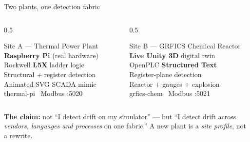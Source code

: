 \documentclass[aspectratio=169,11pt]{beamer}
\newcommand{\hl}[1]{{\color{accent}\textbf{#1}}}
\newcommand{\code}[1]{{\ttfamily\small #1}}
\begin{document}
\begin{frame}{Two plants, one detection fabric}
\begin{columns}[T]
\begin{column}{0.5\textwidth}
\begin{block}{Site A --- Thermal Power Plant}
\small
\textbf{Raspberry Pi} (real hardware)\\
Rockwell \textbf{L5X} ladder logic\\
Structural \emph{+} register detection\\
Animated SVG SCADA mimic\\
\code{thermal-pi} \textbullet\ Modbus :5020
\end{block}
\end{column}
\begin{column}{0.5\textwidth}
\begin{block}{Site B --- GRFICS Chemical Reactor}
\small
\textbf{Live Unity 3D} digital twin\\
OpenPLC \textbf{Structured Text}\\
Register-plane detection\\
Reactor + gauges + explosion\\
\code{grfics-chem} \textbullet\ Modbus :5021
\end{block}
\end{column}
\end{columns}
\vspace{8pt}
\begin{center}\small
\hl{The claim:} not ``I detect drift on my simulator'' --- but ``I detect drift across \emph{vendors,
languages and processes} on one fabric.'' A new plant is a \emph{site profile}, not a rewrite.
\end{center}
\end{frame}
\end{document}
